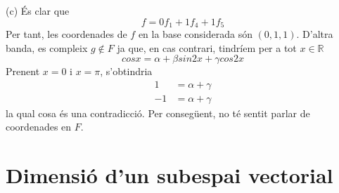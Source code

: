 \begin{solucio}
(c) És clar que
\begin{equation*}
f=0f_{1}+1f_{4}+1f_{5}
\end{equation*}%
Per tant, les coordenades de $f$ en la base considerada són $(0,1,1)$. D’altra banda, es compleix $g\notin F$ ja que, en cas contrari, tindríem per a tot $x\in \mathbb{R}$%
\begin{equation*}
cosx=\alpha +\beta sin2x+\gamma cos2x
\end{equation*}%
Prenent $x=0$ i $x=\pi $, s’obtindria%
\begin{align*}
1 &=\alpha +\gamma \\
-1 &=\alpha +\gamma
\end{align*}%
la qual cosa és una contradicció. Per consegüent, no té sentit parlar
de coordenades en $F$.
\end{solucio}

\section{Dimensió d’un subespai vectorial}

